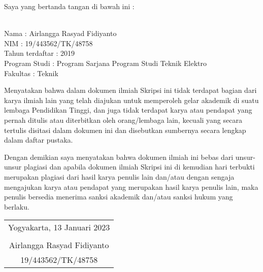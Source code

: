 \noindent Saya yang bertanda tangan di bawah ini :

\vspace{-1em}

\begin{tabbing}
\hspace{40mm} \= \\ %
\noindent Nama \> : Airlangga Rasyad Fidiyanto \\[\parskip]
\noindent NIM \> : 19/443562/TK/48758 \\[\parskip]
\noindent Tahun terdaftar \> : 2019 \\[\parskip]
\noindent Program Studi \> : Program Sarjana Program Studi Teknik Elektro \\[\parskip]
\noindent Fakultas \> : Teknik
\end{tabbing}

\noindent Menyatakan bahwa dalam dokumen ilmiah Skripsi ini tidak terdapat bagian dari karya ilmiah lain yang telah diajukan untuk memperoleh gelar akademik di suatu lembaga Pendidikan Tinggi, dan juga tidak terdapat karya atau pendapat yang pernah ditulis atau diterbitkan oleh orang/lembaga lain, kecuali yang secara tertulis disitasi dalam dokumen ini dan disebutkan sumbernya secara lengkap dalam daftar pustaka.

\noindent Dengan demikian saya menyatakan bahwa dokumen ilmiah ini bebas dari unsur-unsur plagiasi dan apabila dokumen ilmiah Skripsi ini di kemudian hari terbukti merupakan plagiasi dari hasil karya penulis lain dan/atau dengan sengaja mengajukan karya atau pendapat yang merupakan hasil karya penulis lain, maka penulis bersedia menerima sanksi akademik dan/atau sanksi hukum yang berlaku.


\begin{flushright}
	\begin{tabular}{c}
		Yogyakarta, 13 Januari 2023 \\
		\vspace{1.5cm} \\
		Airlangga Rasyad Fidiyanto \\ 19/443562/TK/48758
	\end{tabular}
\end{flushright}